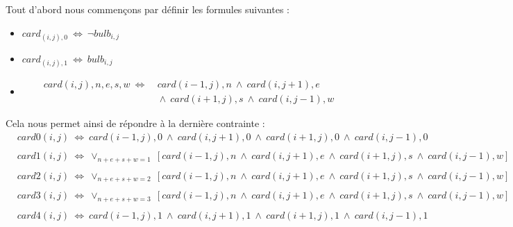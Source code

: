\documentclass{article}
\begin{document}
Tout d'abord nous commen\c{c}ons par d\'efinir les formules suivantes :
\begin{itemize}
\item $ card_{(i,j),0} ~ \Leftrightarrow ~ \neg bulb_{i,j} $
\item $ card_{(i,j),1} ~ \Leftrightarrow ~ bulb_{i,j} $
\item 
\begin{align}
\nonumber card(i,j),n,e,s,w ~ \Leftrightarrow &~card(i-1,j),n ~ \wedge ~ card(i,j+1),e
\\ 
\nonumber
&~ \wedge ~ card(i+1,j),s ~ \wedge ~ card(i,j-1),w 
\end{align}
\end{itemize}
Cela nous permet ainsi de r\'epondre \`a la derni\`ere contrainte :
\begin{align}
\nonumber
&card0(i,j) ~ \Leftrightarrow ~ card(i-1,j),0 ~ \wedge ~ card(i,j+1),0~ \wedge ~ card(i+1,j),0 ~ \wedge ~ card(i,j-1),0\\
\nonumber
\\
\nonumber
&card1(i,j) ~ \Leftrightarrow ~ \vee_{n+e+s+w = 1} ~ [card(i-1,j),n ~ \wedge ~ card(i,j+1),e ~ \wedge ~ card(i+1,j),s ~ \wedge ~ card(i,j-1),w]\\
\nonumber
\\
\nonumber
&card2(i,j) ~ \Leftrightarrow ~ \vee_{n+e+s+w = 2} ~ [card(i-1,j),n ~ \wedge ~ card(i,j+1),e~ \wedge ~ card(i+1,j),s ~ \wedge ~ card(i,j-1),w]\\
\nonumber
\\
\nonumber
&card3(i,j) ~ \Leftrightarrow ~ \vee_{n+e+s+w = 3} ~ [card(i-1,j),n ~ \wedge ~ card(i,j+1),e~ \wedge ~ card(i+1,j),s ~ \wedge ~ card(i,j-1),w]\\
\nonumber
\\
\nonumber
&card4(i,j) ~ \Leftrightarrow ~ card(i-1,j),1 ~ \wedge ~ card(i,j+1),1 ~ \wedge ~ card(i+1,j),1 ~ \wedge ~ card(i,j-1),1\\
\nonumber
\end{align}
\end{document}
